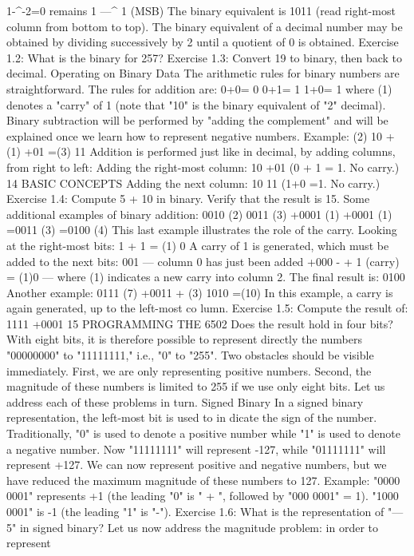 1-^-2=0 remains 1 —^ 1 (MSB)
The binary equivalent is 1011 (read right-most column from bottom
to top).
The binary equivalent of a decimal number may be obtained by dividing
successively by 2 until a quotient of 0 is obtained.
Exercise 1.2: What is the binary for 257?
Exercise 1.3: Convert 19 to binary, then back to decimal.
Operating on Binary Data
The arithmetic rules for binary numbers are straightforward. The rules
for addition are:
0+0= 0
0+1= 1
1+0= 1
where (1) denotes a "carry" of 1 (note that "10" is the binary equivalent
of "2" decimal). Binary subtraction will be performed by "adding the
complement" and will be explained once we learn how to represent
negative numbers.
Example:
(2) 10
+(1) +01
=(3) 11
Addition is performed just like in decimal, by adding columns, from
right to left:
Adding the right-most column:
10
+01
(0 + 1 = 1. No carry.)
14
BASIC CONCEPTS
Adding the next column:
10
11 (1+0 =1. No carry.)
Exercise 1.4: Compute 5 + 10 in binary. Verify that the result is 15.
Some additional examples of binary addition:
0010 (2) 0011 (3)
+0001 (1) +0001 (1)
=0011 (3) =0100 (4)
This last example illustrates the role of the carry.
Looking at the right-most bits: 1 + 1 = (1) 0
A carry of 1 is generated, which must be added to the next bits:
001 — column 0 has just been added
+000 -
+ 1 (carry)
= (1)0 — where (1) indicates a new
carry into column 2.
The final result is: 0100
Another example:
0111 (7)
+0011 + (3)
1010 =(10)
In this example, a carry is again generated, up to the left-most co
lumn.
Exercise 1.5: Compute the result of:
1111
+0001
15
PROGRAMMING THE 6502
Does the result hold in four bits?
With eight bits, it is therefore possible to represent directly the
numbers "00000000" to "11111111," i.e., "0" to "255". Two
obstacles should be visible immediately. First, we are only
representing positive numbers. Second, the magnitude of these
numbers is limited to 255 if we use only eight bits. Let us address
each of these problems in turn.
Signed Binary
In a signed binary representation, the left-most bit is used to in
dicate the sign of the number. Traditionally, "0" is used to denote
a positive number while "1" is used to denote a negative number.
Now "11111111" will represent -127, while "01111111" will
represent +127. We can now represent positive and negative
numbers, but we have reduced the maximum magnitude of these
numbers to 127.
Example: "0000 0001" represents +1 (the leading "0" is " + ",
followed by "000 0001" = 1).
"1000 0001" is -1 (the leading "1" is "-").
Exercise 1.6: What is the representation of "—5" in signed binary?
Let us now address the magnitude problem: in order to represent
